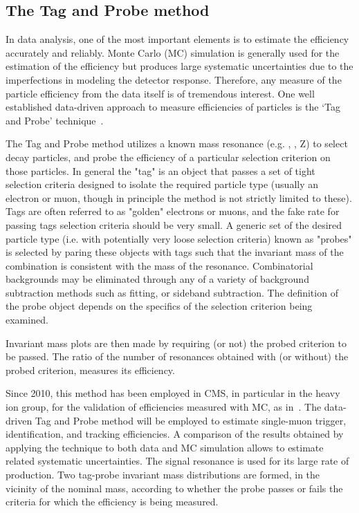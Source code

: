 \subsection{The Tag and Probe method}
\label{sec:tnp}
In data analysis, one of the most important elements is to estimate the efficiency
accurately and reliably. Monte Carlo (MC) simulation is generally used for the estimation
of the efficiency but produces large systematic uncertainties due to the imperfections
in modeling the detector response. Therefore, any measure of the
particle efficiency from the data itself is of tremendous interest.
One well established data-driven approach to measure efficiencies of particles is
the `Tag and Probe' technique~\cite{1748-0221-7-10-P10002}.


The Tag and Probe method utilizes a known mass resonance (e.g. \Jpsi,
\PgU, Z) to select decay particles, and probe the efficiency of a particular selection criterion on those particles. In general the "tag" is an object
that passes a set of tight selection criteria designed to isolate the required particle type (usually an electron or muon,
though in principle the method is not strictly limited to these). Tags are often referred to as "golden" electrons or muons,
and the fake rate for passing tags selection criteria should be very small. A generic set of the
desired particle type (i.e. with potentially very loose selection criteria) known as "probes" is selected by paring
these objects with tags such that the invariant mass of the combination is consistent with the mass of the resonance.
Combinatorial backgrounds may be eliminated through any of a variety of background subtraction methods
such as fitting, or sideband subtraction. The definition of the probe object depends on the specifics of the
selection criterion being examined.

Invariant mass plots are then made by requiring (or not) the probed
criterion to be passed. The ratio of the number of resonances obtained
with (or without) the probed criterion, measures its efficiency.

Since 2010, this method has been employed in CMS, in particular in the
heavy ion group, for the validation of efficiencies measured with MC,
as in~\cite{torsten, HIN-11-007, HIZpaper, HIPsiPaper}.
The data-driven Tag and Probe method will be employed to estimate single-muon trigger, identification,
and tracking efficiencies. A comparison of the results obtained by applying the technique
to both data and MC simulation allows to estimate related systematic uncertainties.
The \Jpsi signal resonance is used for its large rate of production.
Two tag-probe invariant mass distributions are formed, in the vicinity of the \Jpsi nominal mass,
according to whether the probe passes or fails the criteria for which
the efficiency is being measured. 


